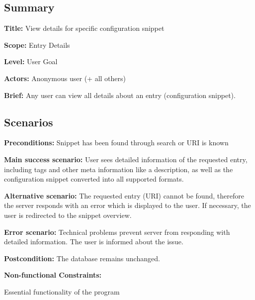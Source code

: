 \subsection*{Summary}


\begin{DoxyItemize}
\item {\bfseries Title\+:} View details for specific configuration snippet
\item {\bfseries Scope\+:} Entry Details
\item {\bfseries Level\+:} User Goal
\item {\bfseries Actors\+:} Anonymous user (+ all others)
\item {\bfseries Brief\+:} Any user can view all details about an entry (configuration snippet).
\end{DoxyItemize}

\subsection*{Scenarios}


\begin{DoxyItemize}
\item {\bfseries Preconditions\+:} Snippet has been found through search or U\+RI is known
\item {\bfseries Main success scenario\+:} User sees detailed information of the requested entry, including tags and other meta information like a description, as well as the configuration snippet converted into all supported formats.
\item {\bfseries Alternative scenario\+:} The requested entry (U\+RI) cannot be found, therefore the server responds with an error which is displayed to the user. If necessary, the user is redirected to the snippet overview.
\item {\bfseries Error scenario\+:} Technical problems prevent server from responding with detailed information. The user is informed about the issue.
\item {\bfseries Postcondition\+:} The database remains unchanged.
\item {\bfseries Non-\/functional Constraints\+:}
\begin{DoxyItemize}
\item Essential functionality of the program 
\end{DoxyItemize}
\end{DoxyItemize}